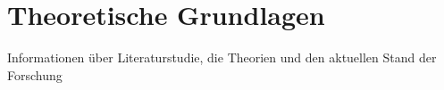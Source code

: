 \chapter{Theoretische Grundlagen}

Informationen über Literaturstudie, die Theorien und den aktuellen Stand der Forschung
